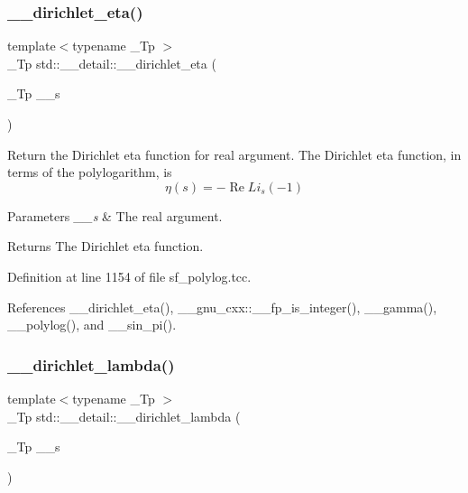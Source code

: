 \subsubsection{\texorpdfstring{\+\_\+\+\_\+dirichlet\+\_\+eta()}{\_\_dirichlet\_eta()}\hspace{0.1cm}{\footnotesize\ttfamily [2/2]}}
{\footnotesize\ttfamily template$<$typename \+\_\+\+Tp $>$ \\
\+\_\+\+Tp std\+::\+\_\+\+\_\+detail\+::\+\_\+\+\_\+dirichlet\+\_\+eta (\begin{DoxyParamCaption}\item[{\+\_\+\+Tp}]{\+\_\+\+\_\+s }\end{DoxyParamCaption})}

Return the Dirichlet eta function for real argument. The Dirichlet eta function, in terms of the polylogarithm, is \[ \renewcommand\Re{\operatorname{Re}} \renewcommand\Im{\operatorname{Im}} \eta(s) = -\Re{Li_s(-1)} \]


\begin{DoxyParams}{Parameters}
{\em \+\_\+\+\_\+s} & The real argument. \\
\hline
\end{DoxyParams}
\begin{DoxyReturn}{Returns}
The Dirichlet eta function. 
\end{DoxyReturn}


Definition at line 1154 of file sf\+\_\+polylog.\+tcc.



References \+\_\+\+\_\+dirichlet\+\_\+eta(), \+\_\+\+\_\+gnu\+\_\+cxx\+::\+\_\+\+\_\+fp\+\_\+is\+\_\+integer(), \+\_\+\+\_\+gamma(), \+\_\+\+\_\+polylog(), and \+\_\+\+\_\+sin\+\_\+pi().

\mbox{\label{namespacestd_1_1____detail_a6ee8ae93ba65207de8ef3d6bb162b192}} 
\subsubsection{\texorpdfstring{\+\_\+\+\_\+dirichlet\+\_\+lambda()}{\_\_dirichlet\_lambda()}}
{\footnotesize\ttfamily template$<$typename \+\_\+\+Tp $>$ \\
\+\_\+\+Tp std\+::\+\_\+\+\_\+detail\+::\+\_\+\+\_\+dirichlet\+\_\+lambda (\begin{DoxyParamCaption}\item[{\+\_\+\+Tp}]{\+\_\+\+\_\+s }\end{DoxyParamCaption})}

